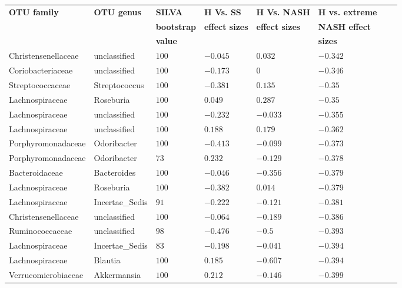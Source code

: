 \begin{table}[!ht]
\begin{tiny}
\begin{tabular}{|l|l|l|l|l|l|l|l|}
\hline
\bf{OTU family} & \bf{OTU genus} & \bf{SILVA} &\bf{H Vs. SS} & \bf{H Vs. NASH} & \bf{H vs. extreme} \\
& & \bf{bootstrap} & \bf{effect sizes} & \bf{effect sizes} & \bf{NASH effect} \\
& & \bf{value} & & & \bf{sizes}\\ \hline
Christensenellaceae & unclassified & $100$ & $-0.045$ & $0.032$ & $-0.342$ \\ \hline
Coriobacteriaceae & unclassified & $100$ & $-0.173$ & $0$ & $-0.346$ \\ \hline
Streptococcaceae & Streptococcus & $100$ & $-0.381$ & $0.135$ & $-0.35$ \\ \hline
Lachnospiraceae & Roseburia & $100$ & $0.049$ & $0.287$ & $-0.35$ \\ \hline
Lachnospiraceae & unclassified & $100$ & $-0.232$ & $-0.033$ & $-0.355$ \\ \hline
Lachnospiraceae & unclassified & $100$ & $0.188$ & $0.179$ & $-0.362$ \\ \hline
Porphyromonadaceae & Odoribacter & $100$ & $-0.413$ & $-0.099$ & $-0.373$ \\ \hline
Porphyromonadaceae & Odoribacter & $73$ & $0.232$ & $-0.129$ & $-0.378$ \\ \hline
Bacteroidaceae & Bacteroides & $100$ & $-0.046$ & $-0.356$ & $-0.379$ \\ \hline
Lachnospiraceae & Roseburia & $100$ & $-0.382$ & $0.014$ & $-0.379$ \\ \hline
Lachnospiraceae & Incertae_Sedis & $91$ & $-0.222$ & $-0.121$ & $-0.381$ \\ \hline
Christensenellaceae & unclassified & $100$ & $-0.064$ & $-0.189$ & $-0.386$ \\ \hline
Ruminococcaceae & unclassified & $98$ & $-0.476$ & $-0.5$ & $-0.393$ \\ \hline
Lachnospiraceae & Incertae_Sedis & $83$ & $-0.198$ & $-0.041$ & $-0.394$ \\ \hline
Lachnospiraceae & Blautia & $100$ & $0.185$ & $-0.607$ & $-0.394$ \\ \hline
Verrucomicrobiaceae & Akkermansia & $100$ & $0.212$ & $-0.146$ & $-0.399$ \\ \hline

\end{tabular}
\end{tiny}
\end{table}
